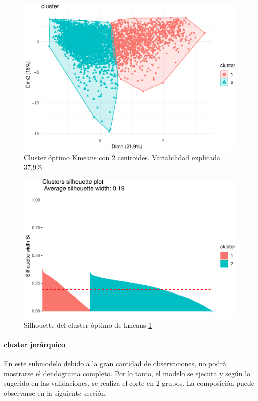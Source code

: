 \begin{figure}[!htb]
	\centering
	\includegraphics{imagenes/modelo_clusters/unnamed-chunk-18-1.pdf}
	\caption{Cluster óptimo Kmeans con 2 centroides. Variabilidad explicada 37.9\%}
	\label{fig:kmeans_cluster_optimo}
\end{figure}

\begin{figure}[!htb]
	\centering
	\includegraphics{imagenes/modelo_clusters/unnamed-chunk-18-2.pdf}
	\caption{Silhouette del cluster óptimo de kmeans \ref{fig:kmeans_cluster_optimo}}
	\label{fig:kmeans_cluster_optimo_silhouette}
\end{figure}


\clearpage


\hypertarget{cluster-jeruxe1rquico}{%
	\paragraph{cluster jerárquico}\label{cluster-jeruxe1rquico}}
En este submodelo debido a la gran cantidad de observaciones, no podrá mostrarse el dendograma completo. Por lo tanto, el modelo se ejecuta y según lo sugerido en
las validaciones, se realiza el corte en 2 grupos. La composición puede observarse en la siguiente sección.


